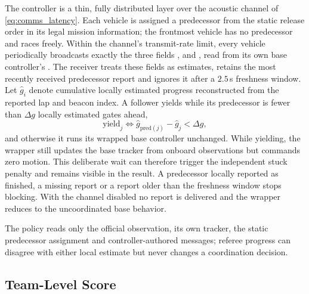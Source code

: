 The controller is a thin, fully distributed layer over the acoustic channel of \eqref{eq:comms_latency}. Each vehicle is assigned a predecessor from the static release order in its legal mission information; the frontmost vehicle has no predecessor and races freely. Within the channel's transmit-rate limit, every vehicle periodically broadcasts exactly the three fields ,  and , read from its own base controller's . The receiver treats these fields as estimates, retains the most recently received predecessor report and ignores it after a $2.5$\,s freshness window. Let $\hat g_i$ denote cumulative locally estimated progress reconstructed from the reported lap and beacon index. A follower yields while its predecessor is fewer than $\Delta g$ locally estimated gates ahead,
\begin{equation}
\label{eq:yield}
\text{yield}_j \iff \hat g_{\mathrm{pred}(j)}-\hat g_j<\Delta g ,
\end{equation}
and otherwise it runs its wrapped base controller unchanged. While yielding, the wrapper still updates the base tracker from onboard observations but commands zero motion. This deliberate wait can therefore trigger the independent stuck penalty and remains visible in the result. A predecessor locally reported as finished, a missing report or a report older than the freshness window stops blocking. With the channel disabled no report is delivered and the wrapper reduces to the uncoordinated base behavior.

The policy reads only the official observation, its own tracker, the static predecessor assignment and controller-authored messages; referee progress can disagree with either local estimate but never changes a coordination decision.

\subsection{Team-Level Score}

